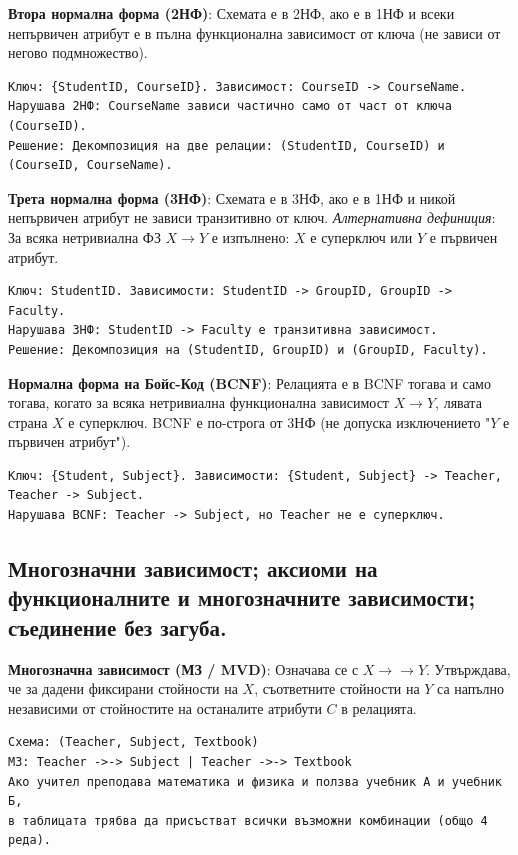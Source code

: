 \documentclass{article}
\renewcommand{\\}{\newline}
\begin{document}
\textbf{Втора нормална форма (2НФ)}: Схемата е в 2НФ, ако е в 1НФ и всеки непървичен атрибут е в пълна функционална зависимост от ключа (не зависи от негово подмножество).
\begin{verbatim}
Ключ: {StudentID, CourseID}. Зависимост: CourseID -> CourseName.
Нарушава 2НФ: CourseName зависи частично само от част от ключа (CourseID).
Решение: Декомпозиция на две релации: (StudentID, CourseID) и (CourseID, CourseName).
\end{verbatim}

\textbf{Трета нормална форма (3НФ)}: Схемата е в 3НФ, ако е в 1НФ и никой непървичен атрибут не зависи транзитивно от ключ.
\textit{Алтернативна дефиниция}: За всяка нетривиална ФЗ $X \rightarrow Y$ е изпълнено: $X$ е суперключ или $Y$ е първичен атрибут.
\begin{verbatim}
Ключ: StudentID. Зависимости: StudentID -> GroupID, GroupID -> Faculty.
Нарушава 3НФ: StudentID -> Faculty е транзитивна зависимост.
Решение: Декомпозиция на (StudentID, GroupID) и (GroupID, Faculty).
\end{verbatim}

\textbf{Нормална форма на Бойс-Код (BCNF)}: Релацията е в BCNF тогава и само тогава, когато за всяка нетривиална функционална зависимост $X \rightarrow Y$, лявата страна $X$ е суперключ. BCNF е по-строга от 3НФ (не допуска изключението "$Y$ е първичен атрибут").
\begin{verbatim}
Ключ: {Student, Subject}. Зависимости: {Student, Subject} -> Teacher, Teacher -> Subject.
Нарушава BCNF: Teacher -> Subject, но Teacher не е суперключ.
\end{verbatim}

\subsection{Многозначни зависимост; аксиоми на функционалните и многозначните зависимости; съединение без загуба.}

\textbf{Многозначна зависимост (МЗ / MVD)}: Означава се с $X \rightarrow\rightarrow Y$. Утвърждава, че за дадени фиксирани стойности на $X$, съответните стойности на $Y$ са напълно независими от стойностите на останалите атрибути $C$ в релацията.
\begin{verbatim}
Схема: (Teacher, Subject, Textbook)
МЗ: Teacher ->-> Subject | Teacher ->-> Textbook
Ако учител преподава математика и физика и ползва учебник А и учебник Б,
в таблицата трябва да присъстват всички възможни комбинации (общо 4 реда).
\end{verbatim}
\end{document}
